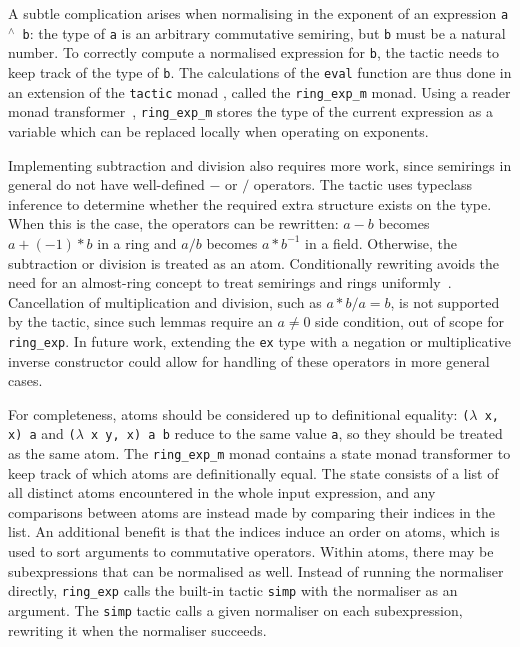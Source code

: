 \documentclass{llncs}
\newcommand{\lean}[1]{\texttt{#1}\xspace} %
\newcommand{\pow}{{${}^\wedge$}\xspace}
\newcommand{\ringexp}{\lean{ring\_exp}}
\begin{document}
A subtle complication arises when normalising in the exponent of an expression \lean{a \pow b}:
the type of \lean{a} is an arbitrary commutative semiring, but \lean{b} must be a natural number.
To correctly compute a normalised expression for \lean{b},
the tactic needs to keep track of the type of \lean{b}.
The calculations of the \lean{eval} function are thus done in an extension of the \lean{tactic} monad%
, called the \lean{ring\_exp\_m} monad.
Using a reader monad transformer~\cite{monad-transformers},
\lean{ring\_exp\_m} stores the type of the current expression
as a variable which can be replaced locally when operating on exponents.

Implementing subtraction and division also requires more work,
since semirings in general do not have well-defined $-$ or $/$ operators.
The tactic uses typeclass inference to determine whether the required extra structure exists on the type.
When this is the case, the operators can be rewritten:
$a - b$ becomes $a + (-1) * b$ in a ring
and $a / b$ becomes $a * b^{-1}$ in a field.
Otherwise, the subtraction or division is treated as an atom.
Conditionally rewriting avoids the need for an almost-ring concept to treat semirings and rings uniformly~\cite{ring-tactic}.
Cancellation of multiplication and division, such as $a * b / a = b$, is not supported by the tactic,
since such lemmas require an $a \ne 0$ side condition, out of scope for \ringexp.
In future work, extending the \lean{ex} type with a negation or multiplicative inverse constructor could allow for handling of these operators in more general cases.

For completeness, atoms should be considered up to definitional equality:
\lean{($\lambda$ x, x) a} and \lean{($\lambda$ x y, x) a b} reduce to the same value \lean{a},
so %
they should be treated as the same atom.
The \lean{ring\_exp\_m} monad contains a state monad transformer to keep track of which atoms are definitionally equal.
The state consists of a list of all distinct atoms encountered in the whole input expression,
and any comparisons between atoms are instead made by comparing their indices in the list.
An additional benefit is that the indices induce an order on atoms, which is used to sort arguments to commutative operators.
Within atoms, there may be subexpressions that can be normalised as well.
Instead of running the normaliser directly, \ringexp calls the built-in tactic \lean{simp} with the normaliser as an argument.
The \lean{simp} tactic calls a given normaliser on each subexpression,
rewriting it when the normaliser succeeds.
\end{document}
